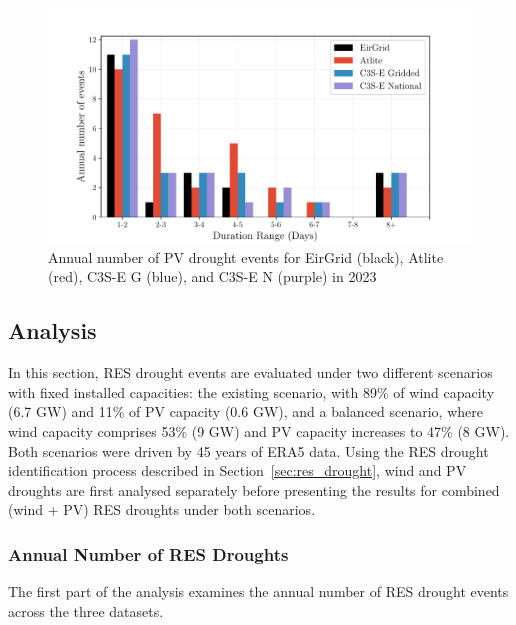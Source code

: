 \documentclass[a4paper, 11pt]{article}
\begin{document}
\begin{figure}[!ht]
	\centering
	\includegraphics[width=\textwidth]{verification_pv_bar}
	\caption{Annual number of PV drought events for EirGrid (black), Atlite (red), C3S-E G (blue), and C3S-E N (purple) in 2023}
	\label{fig:bar_number_events_verification_pv}
\end{figure}

\newpage
\subsection{Analysis}
\label{sec:Analysis}

In this section, RES drought events are evaluated under two different scenarios with fixed installed capacities: the existing scenario, with 89\% of wind capacity (6.7 GW) and 11\% of PV capacity (0.6 GW), and a balanced scenario, where wind capacity comprises 53\% (9 GW) and PV capacity increases to 47\% (8 GW). Both scenarios were driven by 45 years of ERA5 data. Using the RES drought identification process described in Section~\ref{sec:res_drought}, wind and PV droughts are first analysed separately before presenting the results for combined (wind + PV) RES droughts under both scenarios.

\subsubsection{Annual Number of RES Droughts}

The first part of the analysis examines the annual number of RES drought events across the three datasets. 
\end{document}
